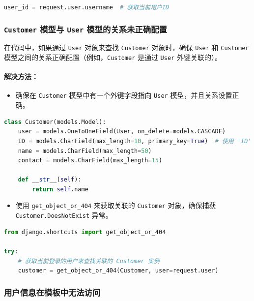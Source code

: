 \documentclass[UTF8,a4paper,12pt]{ctexart}
\begin{document}
\begin{lstlisting}[language=Python]
    user_id = request.user.username  # 获取当前用户ID
\end{lstlisting}

\subsubsection{\texttt{Customer} 模型与 \texttt{User} 模型的关系未正确配置}

在代码中，如果通过 \texttt{User} 对象来查找 \texttt{Customer} 对象时，确保 \texttt{User} 和 \texttt{Customer} 模型之间的关系正确配置（例如，\texttt{Customer} 是通过 \texttt{User} 外键关联的）。

\paragraph{解决方法：}
\begin{itemize}
    \item 确保在 \texttt{Customer} 模型中有一个外键字段指向 \texttt{User} 模型，并且关系设置正确。
\end{itemize}

\begin{lstlisting}[language=Python]
    class Customer(models.Model):
    user = models.OneToOneField(User, on_delete=models.CASCADE)
    ID = models.CharField(max_length=10, primary_key=True)  # 使用 'ID' 作为主键
    name = models.CharField(max_length=50)
    contact = models.CharField(max_length=15)

    def __str__(self):
        return self.name
\end{lstlisting}

\begin{itemize}
    \item 使用 \texttt{get\_object\_or\_404} 来获取关联的 \texttt{Customer} 对象，确保捕获 \texttt{Customer.DoesNotExist} 异常。
\end{itemize}

\begin{lstlisting}[language=Python]
from django.shortcuts import get_object_or_404  

try:
    # 获取当前登录的用户来查找关联的 Customer 实例
    customer = get_object_or_404(Customer, user=request.user)
\end{lstlisting}

\subsubsection{用户信息在模板中无法访问}
\end{document}
